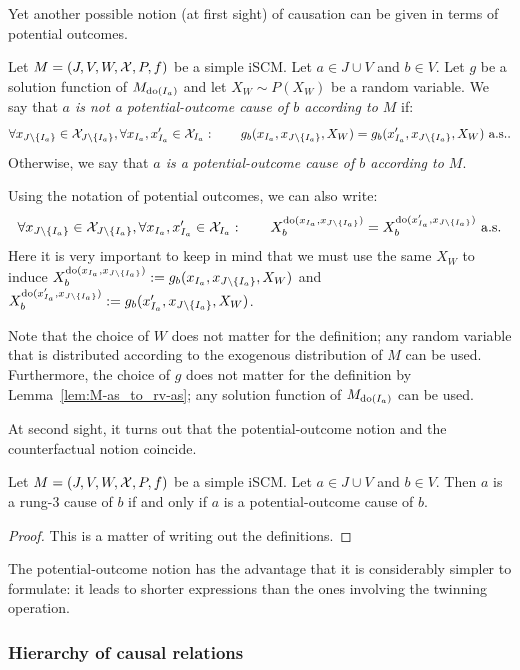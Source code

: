 Yet another possible notion (at first sight) of causation can be given in terms of potential outcomes.
\begin{Def}\label{def:scm_po_cause_of}
  Let $M = \left ( J, V, W, \mathcal{X}, P, f \right )$ be a simple iSCM.
  Let $a \in J \cup V$ and $b \in V$.
  Let $g$ be a solution function of $M_{\operatorname{do}(I_a)}$ and let $X_W \sim P(X_W)$ be a random variable.
  We say that \emph{$a$ is not a potential-outcome cause of $b$ according to $M$} if:
  $$\forall x_{J\setminus\{I_a\}} \in \mathcal{X}_{J\setminus\{I_a\}}, \forall x_{I_a},x_{I_a}' \in \mathcal{X}_{I_a}: \qquad g_b(x_{I_a},x_{J\setminus\{I_a\}},X_W) = g_b(x_{I_a}',x_{J\setminus\{I_a\}},X_W) \text{ a.s..}$$
  Otherwise, we say that \emph{$a$ is a potential-outcome cause of $b$ according to $M$}.
\end{Def}
Using the notation of potential outcomes, we can also write:
  $$\forall x_{J\setminus\{I_a\}} \in \mathcal{X}_{J\setminus\{I_a\}}, \forall x_{I_a},x_{I_a}' \in \mathcal{X}_{I_a}: \qquad X^{\operatorname{do}(x_{I_a},x_{J\setminus\{I_a\}})}_b = X^{\operatorname{do}(x_{I_a}',x_{J\setminus\{I_a\}})}_b \text{ a.s.}$$
Here it is very important to keep in mind that we must use the same $X_W$ to induce $X^{\operatorname{do}(x_{I_a},x_{J\setminus\{I_a\}})}_b := g_b(x_{I_a},x_{J\setminus\{I_a\}},X_W)$ and $X^{\operatorname{do}(x_{I_a}',x_{J\setminus\{I_a\}})}_b := g_b(x_{I_a}',x_{J\setminus\{I_a\}},X_W)$.
\begin{Rem}
Note that the choice of $W$ does not matter for the definition; any random variable that is distributed according to the exogenous distribution of $M$ can be used.
Furthermore, the choice of $g$ does not matter for the definition by Lemma~\ref{lem:M-as_to_rv-as}; any solution function of $M_{\operatorname{do}(I_a)}$ can be used.
\end{Rem}

At second sight, it turns out that the potential-outcome notion and the counterfactual notion coincide.
\begin{Prp}\label{prp:scm_cause_of_rung3_po}
  Let $M = \left ( J, V, W, \mathcal{X}, P, f \right )$ be a simple iSCM.
  Let $a \in J \cup V$ and $b \in V$.
  Then $a$ is a rung-3 cause of $b$ if and only if $a$ is a potential-outcome cause of $b$.
\end{Prp}
\begin{proof}
  This is a matter of writing out the definitions.
\end{proof}
The potential-outcome notion has the advantage that it is considerably simpler to formulate: it leads to shorter expressions than the ones involving the twinning operation.

\subsubsection{Hierarchy of causal relations}

